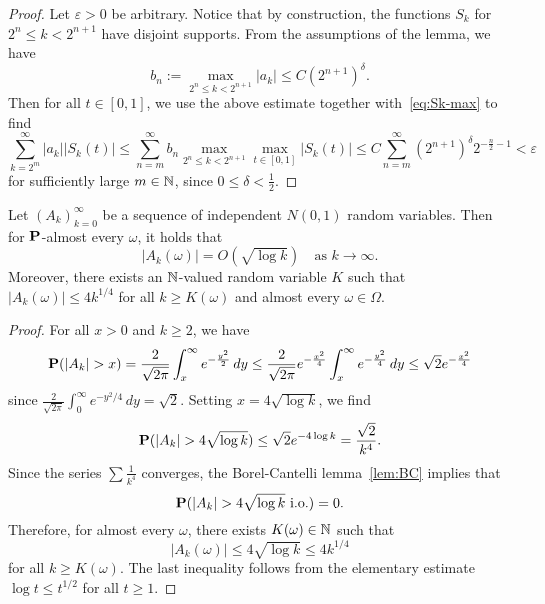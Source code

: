 \begin{proof}
    Let $\varepsilon>0$ be arbitrary. Notice that by construction, the functions $S_k$ for $2^n\le k<2^{n+1}$ have disjoint supports. From the assumptions of the lemma, we have
    \begin{equation*}
        b_n := \max_{2^n\le k<2^{n+1}}|a_k| \le C(2^{n+1})^\delta.
    \end{equation*}
    Then for all $t\in [0,1]$, we use the above estimate together with~\eqref{eq:Sk-max} to find
    \begin{equation*}
        \sum_{k=2^m}^\infty |a_k||S_k(t)| \le \sum_{n=m}^\infty b_n \max_{2^n\le k<2^{n+1}}\max_{t\in [0,1]}|S_k(t)| \le C\sum_{n=m}^\infty (2^{n+1})^\delta 2^{-\frac{n}{2}-1}<\varepsilon
    \end{equation*}
    for sufficiently large $m\in\mathbb{N}$, since $0\le\delta<\frac{1}{2}$.
\end{proof}

\begin{lemma}
\label{lem:log-growth}
    Let $(A_k)_{k=0}^\infty$ be a sequence of independent $N(0,1)$ random variables. Then for $\mathbf{P}$-almost every $\omega$, it holds that
    \begin{equation*}
        |A_k(\omega)| = O(\sqrt{\log k}) \quad\text{as }k\to\infty.
    \end{equation*}
    Moreover, there exists an $\mathbb{N}$-valued random variable $K$ such that $|A_k(\omega)|\le 4k^{1/4}$ for all $k\ge K(\omega)$ and almost every $\omega\in\Omega$.
\end{lemma}

\begin{proof}
    For all $x>0$ and $k\ge 2$, we have
    \begin{equation*}
        \PP(|A_k|>x) = \frac{2}{\sqrt{2\pi}}\int_x^\infty e^{-\frac{y^2}{2}}\,dy \le \frac{2}{\sqrt{2\pi}}e^{-\frac{x^2}{4}}\int_x^\infty e^{-\frac{y^2}{4}}\,dy \le \sqrt{2}e^{-\frac{x^2}{4}}
    \end{equation*}
    since $\frac{2}{\sqrt{2\pi}}\int_0^\infty e^{-y^2/4}\,dy = \sqrt{2}$. Setting $x=4\sqrt{\log k}$, we find
    \begin{equation*}
        \PP(|A_k|>4\sqrt{\log k}) \le \sqrt{2}e^{-4\log k} = \frac{\sqrt{2}}{k^4}.
    \end{equation*}
    Since the series $\sum \frac{1}{k^4}$ converges, the Borel-Cantelli lemma~\eqref{lem:BC} implies that
    \begin{equation*}
        \PP(|A_k|>4\sqrt{\log k} \text{ i.o.}) = 0.
    \end{equation*}
    Therefore, for almost every $\omega$, there exists $K(\omega)\in\mathbb{N}$ such that
    \begin{equation*}
        |A_k(\omega)|\le 4\sqrt{\log k} \le 4k^{1/4}
    \end{equation*}
    for all $k\ge K(\omega)$. The last inequality follows from the elementary estimate $\log t \le t^{1/2}$ for all $t\ge 1$.
\end{proof}

